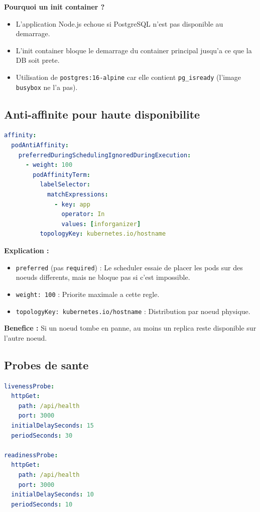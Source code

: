 \documentclass[12pt,a4paper,french]{report}
\begin{document}
\textbf{Pourquoi un init container ?}
\begin{itemize}
    \item L'application Node.js echoue si PostgreSQL n'est pas disponible au demarrage.
    \item L'init container bloque le demarrage du container principal jusqu'a ce que la DB soit prete.
    \item Utilisation de \texttt{postgres:16-alpine} car elle contient \texttt{pg\_isready} (l'image \texttt{busybox} ne l'a pas).
\end{itemize}

\subsection{Anti-affinite pour haute disponibilite}

\begin{lstlisting}[language=yaml, caption=Pod anti-affinity]
affinity:
  podAntiAffinity:
    preferredDuringSchedulingIgnoredDuringExecution:
      - weight: 100
        podAffinityTerm:
          labelSelector:
            matchExpressions:
              - key: app
                operator: In
                values: [inforganizer]
          topologyKey: kubernetes.io/hostname
\end{lstlisting}

\textbf{Explication :}
\begin{itemize}
    \item \texttt{preferred} (pas \texttt{required}) : Le scheduler essaie de placer les pods sur des noeuds differents, mais ne bloque pas si c'est impossible.
    \item \texttt{weight: 100} : Priorite maximale a cette regle.
    \item \texttt{topologyKey: kubernetes.io/hostname} : Distribution par noeud physique.
\end{itemize}

\textbf{Benefice :} Si un noeud tombe en panne, au moins un replica reste disponible sur l'autre noeud.

\subsection{Probes de sante}

\begin{lstlisting}[language=yaml, caption=Liveness et Readiness probes]
livenessProbe:
  httpGet:
    path: /api/health
    port: 3000
  initialDelaySeconds: 15
  periodSeconds: 30

readinessProbe:
  httpGet:
    path: /api/health
    port: 3000
  initialDelaySeconds: 10
  periodSeconds: 10
\end{lstlisting}
\end{document}
